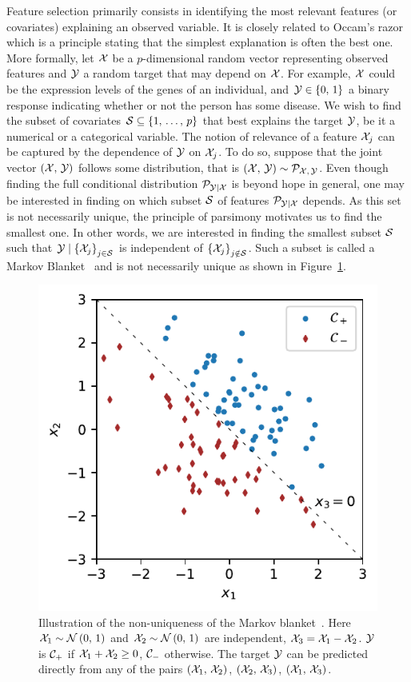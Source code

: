 Feature selection primarily consists in identifying the most relevant features (or covariates)
explaining an observed variable.
It is closely related to Occam's razor which is a principle stating that
the simplest explanation is often the best one.
More formally, let $\mathcal{X}$ be a $p$-dimensional random vector representing observed features
and $\mathcal{Y}$ a random target that may depend on $\mathcal{X}$.
For example, $\mathcal{X}$ could be the expression levels of the genes of an individual,
and $\mathcal{Y} \in \left\{ 0,\, 1 \right\}$ a binary response indicating whether or not the person has some disease.
We wish to find the subset of covariates $\mathcal{S} \subseteq \left\{ 1,\, \dots,\, p \right\}$ that best explains the target $\mathcal{Y}$,
be it a numerical or a categorical variable.
The notion of relevance of a feature $\mathcal{X}_j$ can be captured by the dependence of $\mathcal{Y}$ on $\mathcal{X}_j$.
To do so, suppose that the joint vector $\left( \mathcal{X},\, \mathcal{Y} \right)$ follows some distribution,
that is $\left( \mathcal{X},\, \mathcal{Y} \right) \sim \mathcal{P}_{\mathcal{X},\, \mathcal{Y}}$.
Even though finding the full conditional distribution $\mathcal{P}_{\mathcal{Y} \mid \mathcal{X}}$ is beyond hope in general,
one may be interested in finding on which subset $\mathcal{S}$ of features $\mathcal{P}_{\mathcal{Y} \mid \mathcal{X}}$ depends.
As this set is not necessarily unique,
the principle of parsimony motivates us to find the smallest one.
In other words, we are interested in finding the smallest subset $\mathcal{S}$ such that
$\mathcal{Y} \mid \left\{ \mathcal{X}_j \right\}_{j \in \mathcal{S}}$ is independent of $\left\{ \mathcal{X}_j \right\}_{j \notin \mathcal{S}}$.
Such a subset is called a Markov Blanket~\citep{markov_blanket, markov_blanket_fs}
and is not necessarily unique as shown in Figure~\ref{fig:fs_subset_not_unique}.
\begin{figure}[h]
    \centering
    \includegraphics[width=0.4\linewidth]{figures/fs_subset_not_unique.pdf}
    \caption{
        Illustration of the non-uniqueness of the Markov blanket~\citep{model_x_knockoffs}.
        Here $\mathcal{X}_1 \sim \mathcal{N}\left( 0,\, 1 \right)$
        and $\mathcal{X}_2 \sim \mathcal{N}\left( 0,\, 1 \right)$ are independent,
        $\mathcal{X}_3 = \mathcal{X}_1 - \mathcal{X}_2$.
        $\mathcal{Y}$ is $\mathcal{C}_+$ if $\mathcal{X}_1 + \mathcal{X}_2 \geq 0$,
        $\mathcal{C}_-$ otherwise.
        The target $\mathcal{Y}$ can be predicted directly from any of the pairs
        $\left( \mathcal{X}_1,\, \mathcal{X}_2 \right)$, $\left( \mathcal{X}_2,\, \mathcal{X}_3 \right)$, $\left( \mathcal{X}_1,\, \mathcal{X}_3 \right)$.
    }
    \label{fig:fs_subset_not_unique}
\end{figure}
